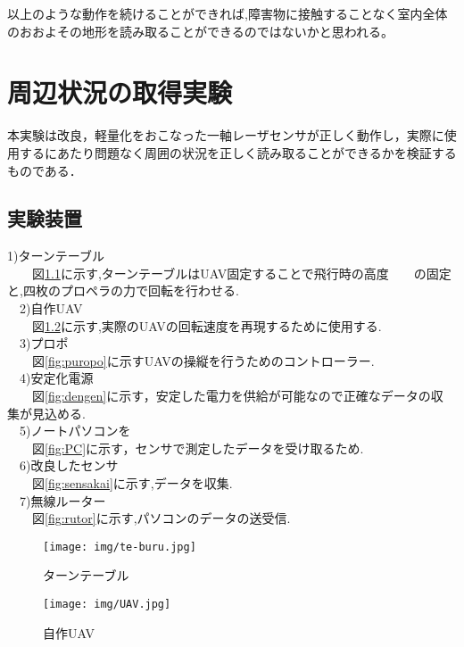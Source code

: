 \documentclass[12pt,oneside]{sotsuken_paper}
\begin{document}
以上のような動作を続けることができれば,障害物に接触することなく室内全体のおおよその地形を読み取ることができるのではないかと思われる。

\chapter{周辺状況の取得実験}本実験は改良，軽量化をおこなった一軸レーザセンサが正しく動作し，実際に使用するにあたり問題なく周囲の状況を正しく読み取ることができるかを検証するものである．

\section{実験装置}
 1)ターンテーブル\\
　　図\ref{fig:te-buru}に示す,ターンテーブルはUAV固定することで飛行時の高度　　の固定と,四枚のプロペラの力で回転を行わせる.\\
  　2)自作UAV\\
　　図\ref{fig:UAV}に示す,実際のUAVの回転速度を再現するために使用する.\\
  　3)プロポ\\
　　図\ref{fig:puropo}に示すUAVの操縦を行うためのコントローラー.\\
  　4)安定化電源\\
　　図\ref{fig:dengen}に示す，安定した電力を供給が可能なので正確なデータの収　　集が見込める.\\
  　5)ノートパソコンを\\
　　図\ref{fig:PC}に示す，センサで測定したデータを受け取るため.\\
  　6)改良したセンサ\\
　　図\ref{fig:sensakai}に示す,データを収集.\\
  　7)無線ルーター\\
　　図\ref{fig:rutor}に示す,パソコンのデータの送受信.\\


\begin{figure}[H]
\begin{center}
\texttt{[image: img/te-buru.jpg]}
\end{center}
\caption{ターンテーブル}
\label{fig:te-buru}
\end{figure}

\begin{figure}[H]
\begin{center}
\texttt{[image: img/UAV.jpg]}
\end{center}
\caption{自作UAV}
\label{fig:UAV}
\end{figure}
\end{document}
